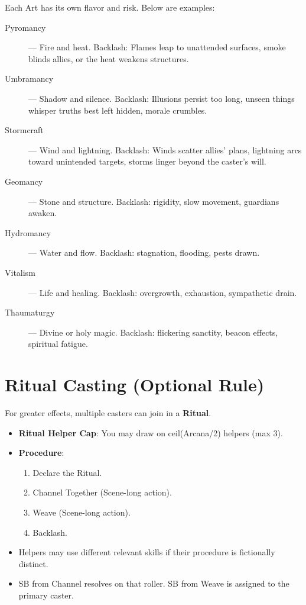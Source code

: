 Each Art has its own flavor and risk. Below are examples:

\begin{description}
  \item[Pyromancy]  — Fire and heat. Backlash: Flames leap to unattended surfaces, smoke blinds allies, or the heat weakens structures.
  \item[Umbramancy]  — Shadow and silence. Backlash: Illusions persist too long, unseen things whisper truths best left hidden, morale crumbles.
  \item[Stormcraft]  — Wind and lightning. Backlash: Winds scatter allies' plans, lightning arcs toward unintended targets, storms linger beyond the caster's will.
  \item[Geomancy]  — Stone and structure. Backlash: rigidity, slow movement, guardians awaken.
  \item[Hydromancy]  — Water and flow. Backlash: stagnation, flooding, pests drawn.
  \item[Vitalism]  — Life and healing. Backlash: overgrowth, exhaustion, sympathetic drain.
  \item[Thaumaturgy]  — Divine or holy magic. Backlash: flickering sanctity, beacon effects, spiritual fatigue.
\end{description}

\section{Ritual Casting (Optional Rule)}

For greater effects, multiple casters can join in a \textbf{Ritual}.

\begin{itemize}
  \item \textbf{Ritual Helper Cap}: You may draw on ceil(Arcana/2) helpers (max 3).
  \item \textbf{Procedure}:
  \begin{enumerate}
    \item Declare the Ritual.
    \item Channel Together (Scene-long action).
    \item Weave (Scene-long action).
    \item Backlash.
  \end{enumerate}
  \item Helpers may use different relevant skills if their procedure is fictionally distinct.
  \item SB from Channel resolves on that roller. SB from Weave is assigned to the primary caster.
\end{itemize}

